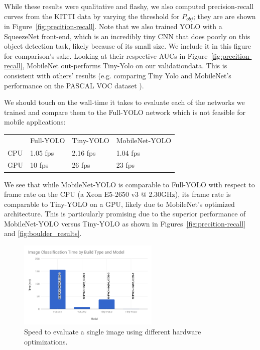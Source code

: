 \documentclass{article}
\begin{document}
While these results were qualitative and flashy, we also computed precision-recall curves from the KITTI data by varying the threshold for $P_{obj}$; they are are shown in Figure~\ref{fig:precition-recall}. Note that we also trained YOLO with a SqueezeNet front-end, which is an incredibly tiny CNN that does poorly on this object detection task, likely because of its small size. We include it in this figure for comparison's sake. Looking at their respective AUCs in Figure~\ref{fig:precition-recall}, MobileNet out-performs Tiny-Yolo on our validationdata. This is consistent with others' results (e.g. comparing Tiny Yolo and MobileNet's performance on the PASCAL VOC dataset \cite{mobilenet_on_voc}).

We should touch on the wall-time it takes to evaluate each of the networks we trained and compare them to the Full-YOLO network which is not feasible for mobile applications:
\begin{center}
\begin{tabular}{llll}
    & Full-YOLO & Tiny-YOLO & MobileNet-YOLO \\
CPU & 1.05 fps  & 2.16 fps  & 1.04 fps       \\
GPU & 10 fps    & 26 fps    & 23 fps        
\end{tabular}
\end{center}
We see that while MobileNet-YOLO is comparable to Full-YOLO with respect to frame rate on the CPU (a Xeon E5-2650 v3 @ 2.30GHz), its frame rate is comparable to Tiny-YOLO on a GPU, likely due to MobileNet's optimized architecture. This is particularly promising due to the superior performance of MobileNet-YOLO versus Tiny-YOLO as shown in Figures~\ref{fig:precition-recall} and \ref{fig:boulder_results}.

\begin{figure}[t]
  \centering
  \includegraphics[width=0.6\textwidth]{images/hardware.png}
  \caption{Speed to evaluate a single image using different hardware optimizations.}
  \label{fig:hardware}
\end{figure}
\end{document}
